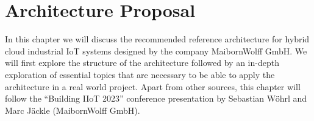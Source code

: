 \chapter{Architecture Proposal}
\label{chapter:architecture-proposal}

In this chapter we will discuss the recommended reference architecture for hybrid cloud industrial IoT systems designed by the company MaibornWolff GmbH. We will first explore the structure of the architecture followed by an in-depth exploration of essential topics that are necessary to be able to apply the architecture in a real world project. Apart from other sources, this chapter will follow the ``Building IIoT 2023'' conference presentation \cite{building_iiot} by Sebastian Wöhrl and Marc Jäckle (MaibornWolff GmbH).
 
    
    
    
    
        
    
    